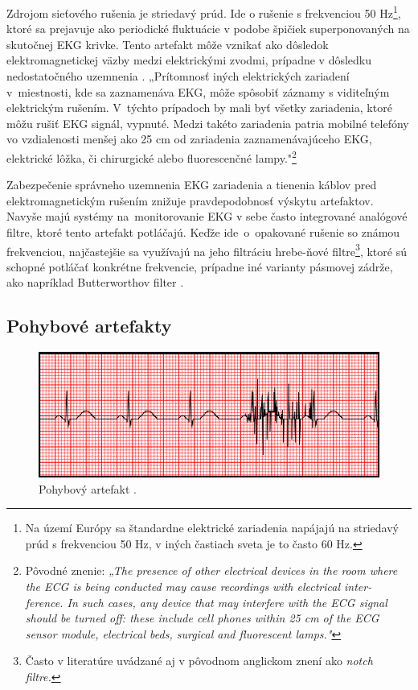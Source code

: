 Zdrojom sieťového rušenia je striedavý prúd. Ide o rušenie s frekvenciou 50 Hz\footnote{Na území Európy sa štandardne elektrické zariadenia napájajú na striedavý prúd s frekvenciou 50 Hz, v iných častiach sveta je to často 60 Hz.}, ktoré sa prejavuje ako periodické fluktuácie v podobe špičiek superponovaných na skutočnej EKG krivke. Tento artefakt môže vznikať ako dôsledok elektromagnetickej väzby medzi elektrickými zvodmi, prípadne v dôsledku nedostatočného uzemnenia \cite{Huhta1973}. „Prítomnosť iných elektrických zariadení v~miestnosti, kde sa zaznamenáva EKG, môže spôsobiť záznamy s viditeľným elektrickým rušením. V~týchto prípadoch by mali byť všetky zariadenia, ktoré môžu rušiť EKG signál, vypnuté. Medzi takéto zariadenia patria mobilné telefóny vo vzdialenosti menšej ako 25 cm od zariadenia zaznamenávajúceho EKG, elektrické lôžka, či chirurgické alebo fluorescenčné lampy."\footnote{Pôvodné znenie: \textit{„The presence of other electrical devices in the room where the ECG is being conducted may cause recordings with electrical inter- ference. In such cases, any device that may interfere with the ECG signal should be turned off: these include cell phones within 25 cm of the ECG sensor module, electrical beds, surgical and fluorescent lamps."}} \cite{PrezRiera2017}

Zabezpečenie správneho uzemnenia EKG zariadenia a tienenia káblov pred elektromagnetickým rušením znižuje pravdepodobnosť výskytu artefaktov. Navyše majú systémy na~monitorovanie EKG v sebe často integrované analógové filtre, ktoré tento artefakt potláčajú. Keďže ide~o~opakované rušenie so známou frekvenciou, najčastejšie sa využívajú na jeho filtráciu hrebe-ňové filtre\footnote{Často v literatúre uvádzané aj v pôvodnom anglickom znení ako \textit{notch filtre.}}, ktoré sú schopné potláčať konkrétne frekvencie, prípadne iné varianty pásmovej zádrže, ako napríklad Butterworthov filter \cite{Gilani2018}.

\subsection{Pohybové artefakty}

\begin{figure}[H]
    \centering
    \includegraphics[scale=0.7]{img/tremor.jpg}
    \caption{Pohybový artefakt \cite{Mauvila_2018}.}
\end{figure}

